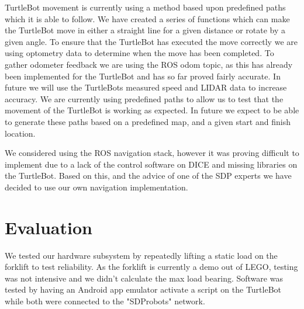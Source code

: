 \documentclass{article}
\begin{document}


TurtleBot movement is currently using a method based upon predefined paths which it is able to follow.
We have created a series of functions which can make the TurtleBot move in either a straight line for a given distance or rotate by a given angle.
To ensure that the TurtleBot has executed the move correctly we are using optometry data to determine when the move has been completed. 
To gather odometer feedback we are using the ROS odom topic, as this has already been implemented for the TurtleBot and has so far proved fairly accurate.
In future we will use the TurtleBots measured speed and LIDAR data to increase accuracy.
We are currently using predefined paths to allow us to test that the movement of the TurtleBot is working as expected. In future we expect to be able to generate these paths based on a predefined map, and a given start and finish location.

We considered using the ROS navigation stack, however it was proving difficult to implement due to a lack of the control software on DICE and missing libraries on the TurtleBot. 
Based on this, and the advice of one of the SDP experts we have decided to use our own navigation implementation.

\section{Evaluation}

We tested our hardware subsystem by repeatedly lifting a static load on the forklift to test reliability. As the forklift is currently a demo out of LEGO, testing was not intensive and we didn't calculate the max load bearing.
Software was tested by having an Android app emulator activate a script on the TurtleBot while both were connected to the "SDProbots" network.
\end{document}
